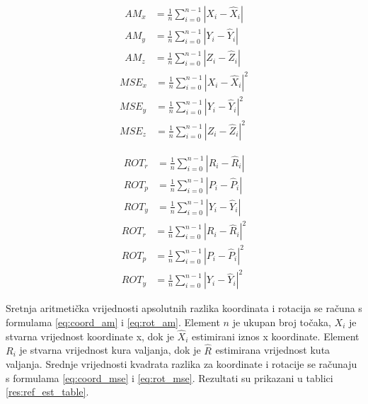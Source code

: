 \begin{equation}
  \begin{aligned}
AM_{x} &= \frac{1}{n}\sum_{i=0}^{n-1} |X_{i} - \hat{X}_{i}|\\
AM_{y} &= \frac{1}{n}\sum_{i=0}^{n-1} |Y_{i} - \hat{Y}_{i}|\\
AM_{z} &= \frac{1}{n}\sum_{i=0}^{n-1} |Z_{i} - \hat{Z}_{i}|
  \end{aligned}
  \label{eq:coord_am}
\end{equation}
\begin{equation}
  \begin{aligned}
MSE_{x} &= \frac{1}{n}\sum_{i=0}^{n-1} |X_{i} - \hat{X}_{i}|^2\\
MSE_{y} &= \frac{1}{n}\sum_{i=0}^{n-1} |Y_{i} - \hat{Y}_{i}|^2\\
MSE_{z} &= \frac{1}{n}\sum_{i=0}^{n-1} |Z_{i} - \hat{Z}_{i}|^2
  \end{aligned}
  \label{eq:coord_mse}
\end{equation}

\begin{equation}
  \begin{aligned}
ROT_{r} &= \frac{1}{n}\sum_{i=0}^{n-1} |R_{i} - \hat{R}_{i}|\\
ROT_{p} &= \frac{1}{n}\sum_{i=0}^{n-1} |P_{i} - \hat{P}_{i}|\\
ROT_{y} &= \frac{1}{n}\sum_{i=0}^{n-1} |Y_{i} - \hat{Y}_{i}|
  \end{aligned}
  \label{eq:rot_am}
\end{equation}
\begin{equation}
  \begin{aligned}
ROT_{r} &= \frac{1}{n}\sum_{i=0}^{n-1} |R_{i} - \hat{R}_{i}|^2\\
ROT_{p} &= \frac{1}{n}\sum_{i=0}^{n-1} |P_{i} - \hat{P}_{i}|^2\\
ROT_{y} &= \frac{1}{n}\sum_{i=0}^{n-1} |Y_{i} - \hat{Y}_{i}|^2
  \end{aligned}
  \label{eq:rot_mse}
\end{equation}

Sretnja aritmetička vrijednosti apsolutnih razlika koordinata i rotacija se računa s formulama \ref{eq:coord_am} i \ref{eq:rot_am}. Element $n$ je ukupan broj točaka, $X_{i}$ je stvarna vrijednost koordinate x, dok je $\hat{X}_{i}$ estimirani iznos x koordinate. Element $R_{i}$ je stvarna vrijednost kura valjanja, dok je $\hat{R}_{}$ estimirana vrijednost kuta valjanja. Srednje vrijednosti kvadrata razlika za koordinate i rotacije se računaju s formulama \ref{eq:coord_mse} i \ref{eq:rot_mse}. Rezultati su prikazani u tablici \ref{res:ref_est_table}.

